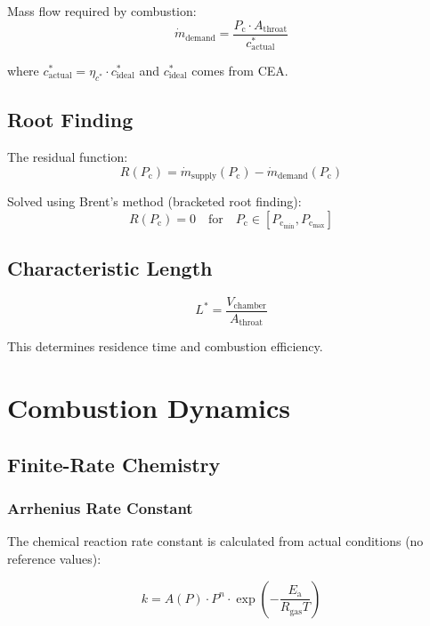 \documentclass[12pt,a4paper]{article}
\newcommand{\mdot}{\dot{m}}
\newcommand{\Pc}{P_{\text{c}}}
\newcommand{\cstar}{c^{*}}
\newcommand{\Lstar}{L^{*}}
\newcommand{\Rgas}{R_{\text{gas}}}
\newcommand{\krate}{k}
\newcommand{\Ea}{E_{\text{a}}}
\begin{document}
Mass flow required by combustion:
\begin{equation}
\mdot_{\text{demand}} = \frac{\Pc \cdot A_{\text{throat}}}{\cstar_{\text{actual}}}
\end{equation}

where $\cstar_{\text{actual}} = \eta_{\cstar} \cdot \cstar_{\text{ideal}}$ and $\cstar_{\text{ideal}}$ comes from CEA.

\subsection{Root Finding}

The residual function:
\begin{equation}
R(\Pc) = \mdot_{\text{supply}}(\Pc) - \mdot_{\text{demand}}(\Pc)
\end{equation}

Solved using Brent's method (bracketed root finding):
\begin{equation}
R(\Pc) = 0 \quad \text{for} \quad \Pc \in [\Pc_{\min}, \Pc_{\max}]
\end{equation}

\subsection{Characteristic Length}

\begin{equation}
\Lstar = \frac{V_{\text{chamber}}}{A_{\text{throat}}}
\end{equation}

This determines residence time and combustion efficiency.

\section{Combustion Dynamics}

\subsection{Finite-Rate Chemistry}

\subsubsection{Arrhenius Rate Constant}

The chemical reaction rate constant is calculated from actual conditions (no reference values):

\begin{equation}
\krate = A(P) \cdot P^n \cdot \exp\left(-\frac{\Ea}{\Rgas T}\right)
\end{equation}
\end{document}
